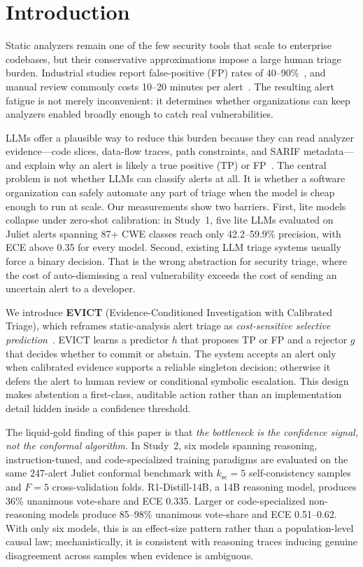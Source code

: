 \section{Introduction}
\label{sec:introduction}

Static analyzers remain one of the few security tools that scale to enterprise codebases, but their conservative approximations impose a large human triage burden. Industrial studies report false-positive (FP) rates of 40--90\%~\cite{johnson2013,christakis2016}, and manual review commonly costs 10--20 minutes per alert~\cite{tencent2023}. The resulting alert fatigue is not merely inconvenient: it determines whether organizations can keep analyzers enabled broadly enough to catch real vulnerabilities.

LLMs offer a plausible way to reduce this burden because they can read analyzer evidence---code slices, data-flow traces, path constraints, and SARIF metadata---and explain why an alert is likely a true positive (TP) or FP~\cite{llm4fpm2024,llm4pfa2024,buglens2024,adataint2023}. The central problem is not whether LLMs can classify alerts at all. It is whether a software organization can safely automate any part of triage when the model is cheap enough to run at scale. Our measurements show two barriers. First, lite models collapse under zero-shot calibration: in Study~1, five lite LLMs evaluated on Juliet alerts spanning 87+ CWE classes reach only 42.2--59.9\% precision, with ECE above 0.35 for every model. Second, existing LLM triage systems usually force a binary decision. That is the wrong abstraction for security triage, where the cost of auto-dismissing a real vulnerability exceeds the cost of sending an uncertain alert to a developer.

We introduce \textbf{EVICT} (Evidence-Conditioned Investigation with Calibrated Triage), which reframes static-analysis alert triage as \emph{cost-sensitive selective prediction}~\cite{elyaniv2010,geifman2017}. EVICT learns a predictor $h$ that proposes TP or FP and a rejector $g$ that decides whether to commit or abstain. The system accepts an alert only when calibrated evidence supports a reliable singleton decision; otherwise it defers the alert to human review or conditional symbolic escalation. This design makes abstention a first-class, auditable action rather than an implementation detail hidden inside a confidence threshold.

The liquid-gold finding of this paper is that \emph{the bottleneck is the confidence signal, not the conformal algorithm}. In Study~2, six models spanning reasoning, instruction-tuned, and code-specialized training paradigms are evaluated on the same 247-alert Juliet conformal benchmark with $k_{\mathrm{sc}}=5$ self-consistency samples and $F=5$ cross-validation folds. R1-Distill-14B, a 14B reasoning model, produces 36\% unanimous vote-share and ECE 0.335. Larger or code-specialized non-reasoning models produce 85--98\% unanimous vote-share and ECE 0.51--0.62. With only six models, this is an effect-size pattern rather than a population-level causal law; mechanistically, it is consistent with reasoning traces inducing genuine disagreement across samples when evidence is ambiguous.

